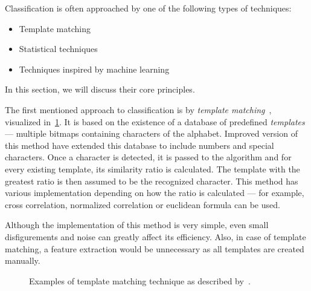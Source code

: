 Classification is often approached by one of the following types of techniques:
\begin{itemize}
    \item Template matching
    \item Statistical techniques
    \item Techniques inspired by machine learning
\end{itemize}

In this section, we will discuss their core principles.

The first mentioned approach to classification is by \emph{template matching}~\citep{templateMatching}, visualized in~\cref{fig:characterClassTemplate}. It is based on the existence of a database of predefined \emph{templates} --- multiple bitmaps containing characters of the alphabet. Improved version of this method have extended this database to include numbers and special characters. Once a character is detected, it is passed to the algorithm and for every existing template, its similarity ratio is calculated. The template with the greatest ratio is then assumed to be the recognized character. This method has various implementation depending on how the ratio is calculated --- for example, cross correlation, normalized correlation or euclidean formula can be used.

Although the implementation of this method is very simple, even small disfigurements and noise can greatly affect its efficiency. Also, in case of template matching, a feature extraction would be unnecessary as all templates are created manually.

\begin{figure}[t]
    \noindent
	\caption{Examples of template matching technique as described by~\citet{Ning1993AnIO}.}
	\label{fig:characterClassTemplate}
\end{figure}

